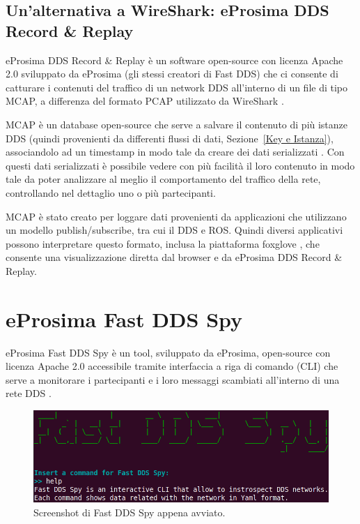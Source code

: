 \subsection{Un'alternativa a WireShark: eProsima DDS Record \& Replay}
eProsima DDS Record \& Replay è un software open-source con licenza 
Apache 2.0 sviluppato da eProsima (gli stessi creatori di Fast DDS) che 
ci consente di catturare i contenuti del traffico di un network DDS
all'interno di un file di tipo MCAP, a differenza del formato PCAP 
utilizzato da WireShark \cite{eProsimaDDSRecordeReplayDocumentation}.

MCAP è un database open-source che serve a salvare il contenuto 
di più istanze DDS (quindi provenienti da differenti flussi di dati, 
Sezione~\ref{Key e Istanza}), associandolo
ad un timestamp in modo tale da creare dei dati serializzati
\cite{mcap}.
Con questi dati serializzati è possibile vedere con più facilità 
il loro contenuto in modo tale da poter analizzare al meglio
il comportamento del traffico della rete, controllando nel dettaglio 
uno o più partecipanti.   

MCAP è stato creato per loggare dati provenienti da applicazioni 
che utilizzano un modello publish/subscribe, tra cui il DDS e ROS.
Quindi diversi applicativi possono interpretare questo formato, 
inclusa la piattaforma 
foxglove \cite{foxglove}, 
che consente una visualizzazione diretta dal browser e da
eProsima DDS Record \& Replay.


\section{eProsima Fast DDS Spy}
eProsima Fast DDS Spy è un tool, sviluppato da eProsima, 
open-source con licenza Apache 2.0 accessibile
tramite interfaccia a riga di comando (CLI) che serve a
monitorare i partecipanti
e i loro messaggi scambiati all'interno di una rete DDS \cite{FastDDSSpy}. 

\begin{figure}[H]
    \centering
    \includegraphics[width=15.2cm, keepaspectratio]{img/fastddsspyintro.png}
    \caption{Screenshot di Fast DDS Spy appena avviato.}
    \label{fastddsspyintro}
\end{figure}

